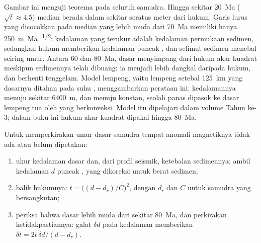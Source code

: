 \begin{omfigure}
\par{}
\label{fig:b1:rifts-ridges-margins:depth-age}
\end{omfigure}

Gambar ini menguji teorema pada seluruh samudra. Hingga sekitar \qty{20}{Ma} ($\sqrt t \approx 4.5$) median berada dalam sekitar seratus meter dari hukum. Garis lurus yang dicocokkan pada median yang lebih muda dari \qty{70}{Ma} memiliki  hanya \qty{250}{m.Ma^{-1/2}}: kedalaman yang terukur adalah kedalaman permukaan sedimen, sedangkan hukum memberikan kedalaman
puncak , dan selimut sedimen menebal seiring umur. Antara 60 dan \qty{80}{Ma}, dasar menyimpang dari hukum akar kuadrat meskipun sedimennya telah dibuang: ia menjadi lebih dangkal daripada hukum, dan berhenti tenggelam.
Model lempeng, yaitu lempeng setebal \qty{125}{km} yang dasarnya ditahan pada suhu , menggambarkan perataan ini: kedalamannya menuju sekitar \qty{6400}{m}, dan  menuju konstan, seolah panas dipasok ke dasar lempeng tua oleh  yang berkonveksi. Model itu dipelajari dalam volume Tahun ke-3; dalam buku ini hukum akar kuadrat dipakai hingga \qty{80}{Ma}.

\begin{method}\label{met:b1:rifts-ridges-margins:age-from-depth}
Untuk memperkirakan umur dasar samudra tempat anomali magnetiknya tidak ada atau belum dipetakan:
\begin{enumerate}
  \item ukur kedalaman dasar dan, dari profil seismik, ketebalan sedimennya; ambil
        kedalaman $d$ puncak , yang dikoreksi untuk berat sedimen;
  \item balik hukumnya: $t = \bigl((d - d_r)/C\bigr)^2$, dengan $d_r$ dan $C$ untuk
        samudra yang bersangkutan;
  \item periksa bahwa dasar lebih muda dari sekitar \qty{80}{Ma}, dan perkirakan
        ketidakpastiannya: galat $\delta d$ pada kedalaman memberikan
        $\delta t = 2t\,\delta d/(d - d_r)$.
\end{enumerate}
\end{method}

